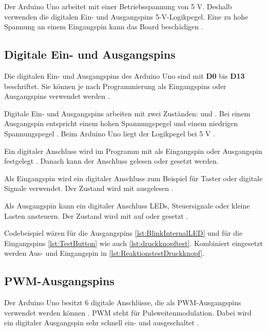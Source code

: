 Der Arduino Uno arbeitet mit einer Betriebsspannung von 5 V. Deshalb verwenden die digitalen Ein- und Ausgangspins 5-V-Logikpegel. Eine zu hohe Spannung an einem Eingangspin kann das Board beschädigen \cite{arduino:uno-datasheet}.

\subsection{Digitale Ein- und Ausgangspins}



Die digitalen Ein- und Ausgangspins des Arduino Uno sind mit \textbf{D0} bis \textbf{D13} beschriftet. Sie können je nach Programmierung als Eingangspins oder Ausgangspins verwendet werden \cite{arduino:uno-r3}\cite{arduino:uno-datasheet}.

Digitale Ein- und Ausgangspins arbeiten mit zwei Zuständen:  und . Bei einem Ausgangspin entspricht  einem hohen Spannungspegel und  einem niedrigen Spannungspegel \cite{arduino_digitalwrite}. Beim Arduino Uno liegt der Logikpegel bei 5 V \cite{arduino:uno-datasheet}.



Ein digitaler Anschluss wird im Programm mit  als Eingangspin oder Ausgangspin festgelegt \cite{arduino_pinmode}. Danach kann der Anschluss gelesen oder gesetzt werden.

Als Eingangspin wird ein digitaler Anschluss zum Beispiel für Taster oder digitale Signale verwendet. Der Zustand wird mit  ausgelesen \cite{arduino_digitalread}.

Als Ausgangspin kann ein digitaler Anschluss LEDs, Steuersignale oder kleine Lasten ansteuern. Der Zustand wird mit  auf  oder  gesetzt \cite{arduino_digitalwrite}.

Codebeispiel wären für die Ausgangspins \ref{lst:BlinkInternalLED} und für die Eingangspins \ref{lst:TestButton} wie auch \ref{lst:druckknopftest}. Kombiniert eingesetzt werden Aus- und Eingangspin in \ref{lst:ReaktionstestDruckknopf}.


\subsection{PWM-Ausgangspins}



Der Arduino Uno besitzt 6 digitale Anschlüsse, die als PWM-Ausgangspins verwendet werden können \cite{arduino:uno-r3}. PWM steht für Pulsweitenmodulation. Dabei wird ein digitaler Ausgangspin sehr schnell ein- und ausgeschaltet \cite{arduino:analogwrite}.

